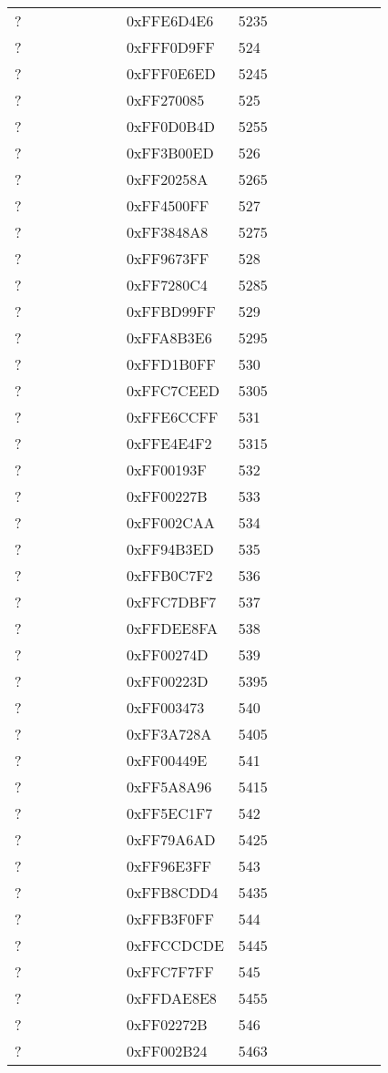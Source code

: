 \begin{longtable}{p{0.3\linewidth} p{0.3\linewidth} p{0.4\linewidth}}
? &  0xFFE6D4E6 &  5235\\
? &  0xFFF0D9FF &  524\\
? &  0xFFF0E6ED &  5245\\
? &  0xFF270085 &  525\\
? &  0xFF0D0B4D &  5255\\
? &  0xFF3B00ED &  526\\
? &  0xFF20258A &  5265\\
? &  0xFF4500FF &  527\\
? &  0xFF3848A8 &  5275\\
? &  0xFF9673FF &  528\\
? &  0xFF7280C4 &  5285\\
? &  0xFFBD99FF &  529\\
? &  0xFFA8B3E6 &  5295\\
? &  0xFFD1B0FF &  530\\
? &  0xFFC7CEED &  5305\\
? &  0xFFE6CCFF &  531\\
? &  0xFFE4E4F2 &  5315\\
? &  0xFF00193F &  532\\
? &  0xFF00227B &  533\\
? &  0xFF002CAA &  534\\
? &  0xFF94B3ED &  535\\
? &  0xFFB0C7F2 &  536\\
? &  0xFFC7DBF7 &  537\\
? &  0xFFDEE8FA &  538\\
? &  0xFF00274D &  539\\
? &  0xFF00223D &  5395\\
? &  0xFF003473 &  540\\
? &  0xFF3A728A &  5405\\
? &  0xFF00449E &  541\\
? &  0xFF5A8A96 &  5415\\
? &  0xFF5EC1F7 &  542\\
? &  0xFF79A6AD &  5425\\
? &  0xFF96E3FF &  543\\
? &  0xFFB8CDD4 &  5435\\
? &  0xFFB3F0FF &  544\\
? &  0xFFCCDCDE &  5445\\
? &  0xFFC7F7FF &  545\\
? &  0xFFDAE8E8 &  5455\\
? &  0xFF02272B &  546\\
? &  0xFF002B24 &  5463\\

\end{longtable}
